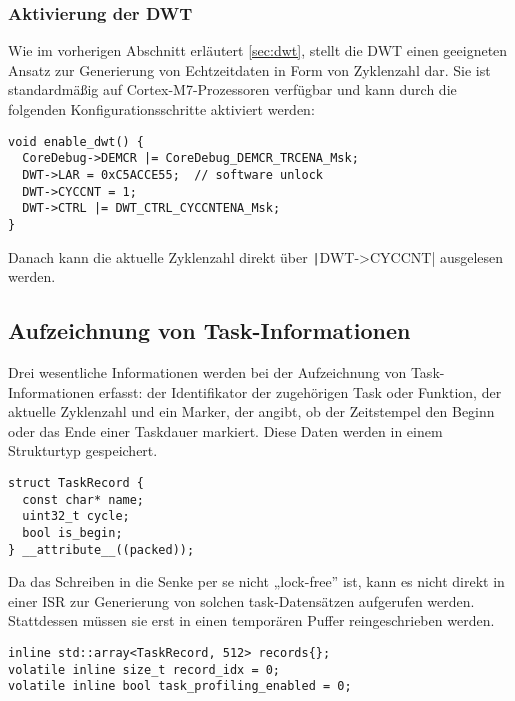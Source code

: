 \subsubsection{Aktivierung der DWT}

Wie im vorherigen Abschnitt erläutert \ref{sec:dwt}, stellt die DWT einen
geeigneten Ansatz zur Generierung von Echtzeitdaten in Form von Zyklenzahl dar.
Sie ist standardmäßig auf Cortex-M7-Prozessoren verfügbar und kann durch die
folgenden Konfigurationsschritte aktiviert werden:

\begin{code}
\begin{verbatim}
void enable_dwt() {
  CoreDebug->DEMCR |= CoreDebug_DEMCR_TRCENA_Msk;
  DWT->LAR = 0xC5ACCE55;  // software unlock
  DWT->CYCCNT = 1;
  DWT->CTRL |= DWT_CTRL_CYCCNTENA_Msk;
}
\end{verbatim}
\end{code}

Danach kann die aktuelle Zyklenzahl direkt über \texttt|DWT->CYCCNT|
ausgelesen werden.

\subsection{Aufzeichnung von Task-Informationen}

Drei wesentliche Informationen werden bei der Aufzeichnung von
Task-Informationen erfasst: der Identifikator der zugehörigen Task oder
Funktion, der aktuelle Zyklenzahl und ein Marker, der angibt, ob der Zeitstempel
den Beginn oder das Ende einer Taskdauer markiert. Diese Daten werden in einem
Strukturtyp gespeichert.

\begin{code}
\begin{verbatim}
struct TaskRecord {
  const char* name;
  uint32_t cycle;
  bool is_begin;
} __attribute__((packed));
\end{verbatim}
\end{code}

Da das Schreiben in die Senke per se nicht „lock-free” ist, kann es nicht direkt
in einer ISR zur Generierung von solchen task-Datensätzen aufgerufen werden.
Stattdessen müssen sie erst in einen temporären Puffer reingeschrieben werden.

\begin{code}
\begin{verbatim}
inline std::array<TaskRecord, 512> records{};
volatile inline size_t record_idx = 0;
volatile inline bool task_profiling_enabled = 0;
\end{verbatim}
\end{code}

